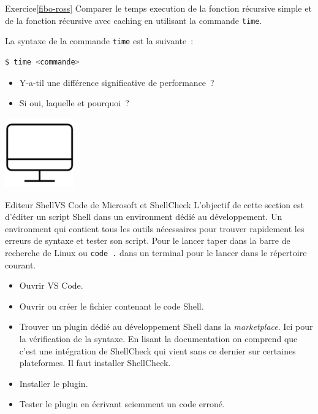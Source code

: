 \documentclass{beamer}
\begin{document}
    \begin{frame}[fragile]{Exercice\cref{fibo-ross} \execcounterdispinc{}}
        Comparer le temps execution de la fonction récursive simple et de la fonction récursive avec caching en utilisant la commande \lstinline{time}.

        La syntaxe de la commande \lstinline{time} est la suivante~:
        \begin{lstlisting}[language=bash]
$ time <commande>
        \end{lstlisting}
        \begin{itemize}
            \item Y-a-til une différence significative de performance~?
            \item Si oui, laquelle et pourquoi~?
        \end{itemize}
        \begin{center}
            \includegraphics[width=3cm]{image/desktop}
        \end{center}
    \end{frame}

    \begin{frame}{Editeur Shell}{VS Code de Microsoft et ShellCheck}
        L'objectif de cette section est d'éditer un script Shell dans un environment dédié au développement.
        Un environment qui contient tous les outils nécessaires pour trouver rapidement les erreurs de syntaxe et tester son script.
        \bigbreak
        Pour le lancer taper  dans la barre de recherche de Linux ou \lstinline{code .} dans un terminal pour le lancer dans le répertoire courant.
        \begin{itemize}
            \item Ouvrir VS Code.
            \item Ouvrir ou créer le fichier contenant le code Shell.
            \item Trouver un plugin dédié au développement Shell dans la \textit{marketplace}.
            Ici  pour la vérification de la syntaxe.
            En lisant la documentation on comprend que c'est une intégration de ShellCheck qui vient sans ce dernier sur certaines plateformes.
            Il faut installer ShellCheck.
            \item Installer le plugin.
            \item Tester le plugin en écrivant sciemment un code erroné.
        \end{itemize}
    \end{frame}
\end{document}
